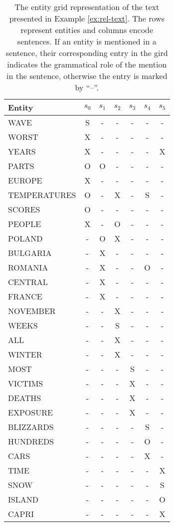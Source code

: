 \begin{table}[!ht]	
	\begin{center}
		\begin{tabular}{lcccccc}
			\toprule
			Entity  		& $s_0$ & $s_1$ & $s_2$ & $s_3$ & $s_4$ & $s_5$ 
			\\
			\midrule
			WAVE 			& S & - & - & - & - & - \\
			WORST 			& X & - & - & - & - & - \\
			YEARS 			& X & - & - & - & - & X \\
			PARTS 			& O & O & - & - & - & - \\
			EUROPE  		& X & - & - & - & - & - \\
			TEMPERATURES  	& O & - & X & - & S & - \\
			SCORES  		& O & - & - & - & - & - \\
			PEOPLE  		& X & - & O & - & - & - \\
			POLAND 			& - & O & X & - & - & - \\
			BULGARIA  		& - & X & - & - & - & - \\
			ROMANIA  		& - & X & - & - & O & - \\
			CENTRAL  		& - & X & - & - & - & - \\
			FRANCE  		& - & X & - & - & - & - \\
			NOVEMBER  		& - & - & X & - & - & - \\
			WEEKS 			& - & - & S & - & - & - \\
			ALL 			& - & - & X & - & - & - \\
			WINTER  		& - & - & X & - & - & - \\
			MOST 			& - & - & - & S & - & - \\
			VICTIMS  		& - & - & - & X & - & - \\
			DEATHS 			& - & - & - & X & - & - \\
			EXPOSURE  		& - & - & - & X & - & - \\
			BLIZZARDS  		& - & - & - & - & S & - \\
			HUNDREDS  		& - & - & - & - & O & - \\
			CARS  			& - & - & - & - & X & - \\
			TIME  			& - & - & - & - & - & X \\
			SNOW  			& - & - & - & - & - & S \\
			ISLAND 			& - & - & - & - & - & O \\
			CAPRI 			& - & - & - & - & - & X \\
			\bottomrule
		\end{tabular}
		\caption{The entity grid representation of the text presented in Example \ref{ex:rel-text}. The rows represent entities and columns encode sentences. 
		If an entity is mentioned in a sentence, their corresponding entry in the gird indicates the grammatical role of the mention in the sentence, otherwise the entry is marked by ``--''.} 
		\label{tab:rel-egrid}
	\end{center}
\end{table}

